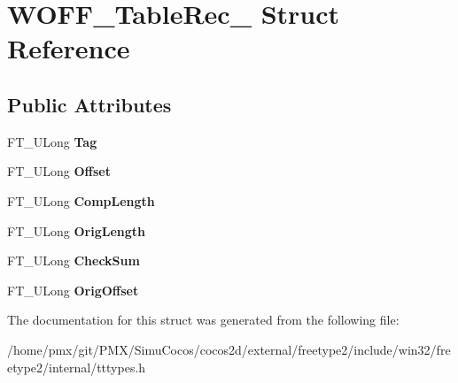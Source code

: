 \hypertarget{structWOFF__TableRec__}{}\section{W\+O\+F\+F\+\_\+\+Table\+Rec\+\_\+ Struct Reference}
\label{structWOFF__TableRec__}
\subsection*{Public Attributes}
\begin{DoxyCompactItemize}
\item 
\mbox{\label{structWOFF__TableRec___a180f01c612c0f50795b78764bc6d85a1}} 
F\+T\+\_\+\+U\+Long {\bfseries Tag}
\item 
\mbox{\label{structWOFF__TableRec___aac56c27dce54415c889ad2be4045851c}} 
F\+T\+\_\+\+U\+Long {\bfseries Offset}
\item 
\mbox{\label{structWOFF__TableRec___a273aa7c18d810be6808e2c857320f7c5}} 
F\+T\+\_\+\+U\+Long {\bfseries Comp\+Length}
\item 
\mbox{\label{structWOFF__TableRec___a42dd043bbef5656aa32461fc0def8340}} 
F\+T\+\_\+\+U\+Long {\bfseries Orig\+Length}
\item 
\mbox{\label{structWOFF__TableRec___a7731a05b663d6bc3548d7c2a9a59f432}} 
F\+T\+\_\+\+U\+Long {\bfseries Check\+Sum}
\item 
\mbox{\label{structWOFF__TableRec___a1722f43cd00f44068a777808525624f1}} 
F\+T\+\_\+\+U\+Long {\bfseries Orig\+Offset}
\end{DoxyCompactItemize}


The documentation for this struct was generated from the following file\+:\begin{DoxyCompactItemize}
\item 
/home/pmx/git/\+P\+M\+X/\+Simu\+Cocos/cocos2d/external/freetype2/include/win32/freetype2/internal/tttypes.\+h\end{DoxyCompactItemize}
